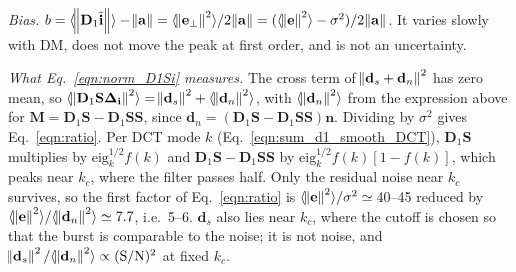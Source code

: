 \documentclass[twocolumn]{aastex631}
\providecommand{\DIFadd}[1]{{\protect\color{BLUE}#1}} %
\begin{document}
\textit{\DIFadd{Bias.}} \DIFadd{$b=\langle\norm{\mathbf{D}_1\tilde{\mathbf{i}}}\rangle-\norm{\mathbf{a}}=\langle\norm{\mathbf{e}_\perp}^2\rangle/2\norm{\mathbf{a}}=(\langle\norm{\mathbf{e}}^2\rangle-\sigma^2)/2\norm{\mathbf{a}}$. It varies slowly with DM, does not move the peak at first order, and is not an uncertainty.
}

\textit{\DIFadd{What Eq.~\eqref{eqn:norm_D1Si} measures.}} \DIFadd{The cross term of $\norm{\mathbf{d}_s+\mathbf{d}_n}^2$ has zero mean, so $\langle\norm{\mathbf{D}_1\mathbf{S}\mathbf{\Delta_i}}^2\rangle=\norm{\mathbf{d}_s}^2+\langle\norm{\mathbf{d}_n}^2\rangle$, with $\langle\norm{\mathbf{d}_n}^2\rangle$ from the expression above for $\mathbf{M}=\mathbf{D}_1\mathbf{S}-\mathbf{D}_1\mathbf{S}\mathbf{S}$, since $\mathbf{d}_n=(\mathbf{D}_1\mathbf{S}-\mathbf{D}_1\mathbf{S}\mathbf{S})\mathbf{n}$. Dividing by $\sigma^2$ gives Eq.~\eqref{eqn:ratio}. Per DCT mode $k$ (Eq.~\ref{eqn:sum_d1_smooth_DCT}), $\mathbf{D}_1\mathbf{S}$ multiplies by $\text{eig}_k^{1/2}f(k)$ and $\mathbf{D}_1\mathbf{S}-\mathbf{D}_1\mathbf{S}\mathbf{S}$ by $\text{eig}_k^{1/2}f(k)[1-f(k)]$, which peaks near $k_c$, where the filter passes half. Only the residual noise near $k_c$ survives, so the first factor of Eq.~\eqref{eqn:ratio} is $\langle\norm{\mathbf{e}}^2\rangle/\sigma^2\simeq$\,40--45 reduced by $\langle\norm{\mathbf{e}}^2\rangle/\langle\norm{\mathbf{d}_n}^2\rangle\simeq7.7$, i.e.\ 5--6. $\mathbf{d}_s$ also lies near $k_c$, where the cutoff is chosen so that the burst is comparable to the noise; it is not noise, and $\norm{\mathbf{d}_s}^2/\langle\norm{\mathbf{d}_n}^2\rangle\propto({\rm S/N})^2$ at fixed $k_c$.
}
\end{document}

